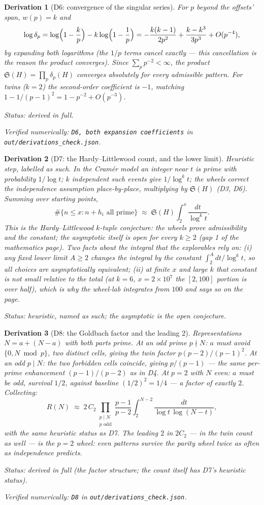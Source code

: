 \documentclass[11pt]{article}
\newtheorem{deriv}{Derivation}
\theoremstyle{remark}
\newcommand{\bucket}[1]{\par\smallskip\noindent\textit{Status: #1.}}
\newcommand{\chk}[1]{\par\noindent\textit{Verified numerically:
\texttt{#1} in \texttt{out/derivations\_check.json}.}}
\begin{document}
\begin{deriv}[D6: convergence of the singular series]\label{d6}
For $p$ beyond the offsets' span, $w(p) = k$ and
\[
\log \delta_p = \log\Bigl(1 - \frac{k}{p}\Bigr)
              - k \log\Bigl(1 - \frac{1}{p}\Bigr)
= -\frac{k(k-1)}{2p^2} + \frac{k - k^3}{3p^3} + O(p^{-4}),
\]
by expanding both logarithms (the $1/p$ terms cancel exactly --- this
cancellation is the reason the product converges). Since
$\sum_p p^{-2} < \infty$, the product
$\mathfrak{S}(H) = \prod_p \delta_p(H)$ converges absolutely for every
admissible pattern. For twins ($k = 2$) the second-order coefficient is
$-1$, matching $1 - 1/(p-1)^2 = 1 - p^{-2} + O(p^{-3})$.
\bucket{derived in full}\chk{D6, both expansion coefficients}
\end{deriv}

\begin{deriv}[D7: the Hardy--Littlewood count, and the lower
limit]\label{d7}
\emph{Heuristic step, labelled as such.} In the Cram\'er model an
integer near $t$ is prime with probability $1/\log t$; $k$ independent
such events give $1/\log^k t$; the wheels correct the independence
assumption place-by-place, multiplying by $\mathfrak{S}(H)$ (D3, D6).
Summing over starting points,
\[
\#\{n \le x : n + h_i \text{ all prime}\}
\;\approx\;
\mathfrak{S}(H) \int_2^x \frac{dt}{\log^k t}.
\]
This \emph{is} the Hardy--Littlewood $k$-tuple conjecture: the wheels
prove admissibility and the constant; the asymptotic itself is open for
every $k \ge 2$ (gap 1 of the mathematics page). Two facts about the
integral that the explorables rely on: (i) any fixed lower limit
$A \ge 2$ changes the integral by the constant
$\int_2^A dt/\log^k t$, so all choices are asymptotically equivalent;
(ii) at finite $x$ and large $k$ that constant is \emph{not} small
relative to the total (at $k = 6$, $x = 2\times10^7$ the $[2, 100]$
portion is over half), which is why the wheel-lab integrates from
$100$ and says so on the page.
\bucket{heuristic, named as such; the asymptotic is the open
conjecture}
\end{deriv}

\begin{deriv}[D8: the Goldbach factor and the leading 2]\label{d8}
Representations $N = a + (N - a)$ with both parts prime. At an odd
prime $p \nmid N$: $a$ must avoid $\{0, N \bmod p\}$, two distinct
cells, giving the twin factor $p(p-2)/(p-1)^2$. At an odd $p \mid N$:
the two forbidden cells coincide, giving $p/(p-1)$ --- the same
per-prime enhancement $(p-1)/(p-2)$ as in D4. At $p = 2$ with $N$
even: $a$ must be odd, survival $1/2$, against baseline
$(1/2)^2 = 1/4$ --- a factor of exactly $2$. Collecting:
\[
R(N) \;\approx\; 2\,C_2 \prod_{\substack{p \mid N\\ p \text{ odd}}}
\frac{p-1}{p-2} \int_2^{N-2} \frac{dt}{\log t\,\log(N-t)},
\]
with the same heuristic status as D7. The leading $2$ in $2C_2$ ---
in the twin count as well --- is the $p = 2$ wheel: even patterns
survive the parity wheel twice as often as independence predicts.
\bucket{derived in full (the factor structure; the count itself has D7's heuristic status)}
\chk{D8}
\end{deriv}
\end{document}
